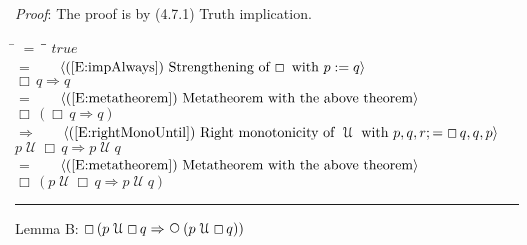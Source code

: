 \documentclass[12pt, fleqn, leqno]{article}
\newcommand{\lgap}{2pt}                             %
\newcommand{\mymathindent}{24pt}                    %
\newcommand{\impl}{\ensuremath{\Rightarrow}}        %
\newcommand{\Until}{\;\mathcal{U}\;}
\newcommand{\Next}{\;\,\text{\raisebox{3.5pt}{\circle{6}}}}
\newcommand{\Always}{\Box\,}
\newcommand{\myqed}{\rule[-.23ex]{1.2ex}{2.0ex}}
\newcommand{\myqedtab}{\hspace{384pt}}              %
\newcommand{\Gll} {\langle}                         %
\newcommand{\Ggg} {\rangle}                         %
\newcommand{\Hint}[1]     {\ \ \ $\Gll              \mbox{#1} \Ggg$ }   %
\begin{document}
\emph{Proof}: The proof is by (4.7.1) Truth implication.
\begin{tabbing}
\hspace{\mymathindent} \= $= \;$ \= \myqedtab \= \kill
  \> \>   $true$\\[\lgap]
  \> $=$ \> \Hint{(\ref{E:impAlways}) Strengthening of $\Always$ with $p:=q$} \\[\lgap]
  \> \>   $\Always q \impl q$\\[\lgap]
   \> $=$ \> \Hint{(\ref{E:metatheorem}) Metatheorem with the above theorem}\\[\lgap]
    \> \>   $\Always (\Always q \impl q)$\\[\lgap]
     \> $\impl$  \>  \Hint{(\ref{E:rightMonoUntil}) Right monotonicity of $\Until$ with $p,q,r ;= \Always q, q, p$}\\[\lgap]
   \> \>   $p \Until \Always q \impl p \Until q$\\[\lgap]
   \> $=$ \> \Hint{(\ref{E:metatheorem}) Metatheorem with the above theorem}\\[\lgap]
   \> \>   $\Always (p \Until \Always q \impl p \Until q)$ \quad \myqed
\end{tabbing}
Lemma B: $\Always (p \Until \Always q \impl \Next (p \Until \Always q))$
\end{document}
